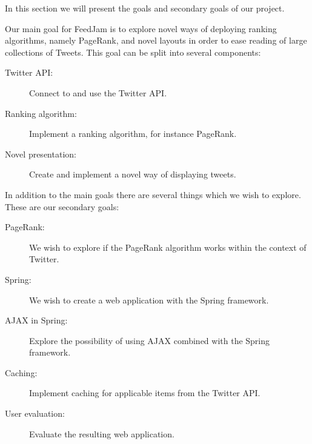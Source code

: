 In this section we will present the goals and secondary goals of our project.

Our main goal for FeedJam is to explore novel ways of deploying ranking algorithms, namely PageRank, and novel layouts in order to ease reading of large collections of Tweets. This goal can be split into several components:

\begin{description}
  \item[Twitter API:] Connect to and use the Twitter API.
  \item[Ranking algorithm:] Implement a ranking algorithm, for instance PageRank.
  \item[Novel presentation:] Create and implement a novel way of displaying tweets.
\end{description}

In addition to the main goals there are several things which we wish to explore. These are our secondary goals:

\begin{description}
  \item[PageRank:] We wish to explore if the PageRank algorithm works within the context of Twitter.
  \item[Spring:] We wish to create a web application with the Spring framework.
  \item[AJAX in Spring:] Explore the possibility of using AJAX combined with the Spring framework.
  \item[Caching:] Implement caching for applicable items from the Twitter API.
  \item[User evaluation:] Evaluate the resulting web application.
\end{description}
